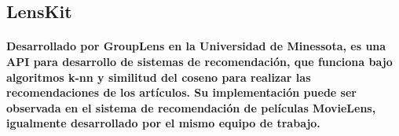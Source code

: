   \subsection{LensKit}
    \paragraph{Desarrollado por GroupLens en la Universidad de Minessota, es una API para desarrollo de sistemas de recomendación, que funciona bajo algoritmos k-nn y similitud del coseno para realizar las recomendaciones de los artículos. Su implementación puede ser observada en el sistema de recomendación de películas MovieLens, igualmente desarrollado por el mismo equipo de trabajo.}
    

